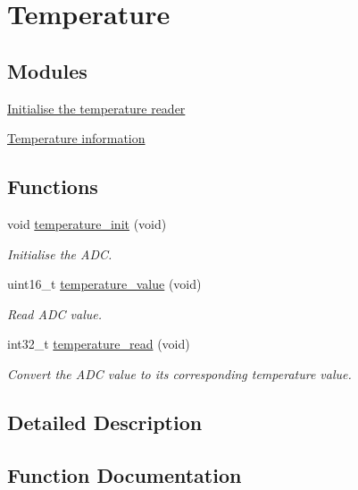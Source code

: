 \hypertarget{group___temperature}{}\section{Temperature}
\label{group___temperature}
\subsection*{Modules}
\begin{DoxyCompactItemize}
\item 
\hyperlink{group___temperature___init}{Initialise the temperature reader}
\item 
\hyperlink{group___temperature___data}{Temperature information}
\end{DoxyCompactItemize}
\subsection*{Functions}
\begin{DoxyCompactItemize}
\item 
void \hyperlink{group___temperature_ga7da890f6748bbeb05511fd20100cb6ef}{temperature\+\_\+init} (void)
\begin{DoxyCompactList}\small\item\em Initialise the A\+DC. \end{DoxyCompactList}\item 
uint16\+\_\+t \hyperlink{group___temperature_ga74915aedf88ee7840a64ab372d768ca1}{temperature\+\_\+value} (void)
\begin{DoxyCompactList}\small\item\em Read A\+DC value. \end{DoxyCompactList}\item 
int32\+\_\+t \hyperlink{group___temperature_gad2e261b9f6af30d5857f1e2a892a9592}{temperature\+\_\+read} (void)
\begin{DoxyCompactList}\small\item\em Convert the A\+DC value to its corresponding temperature value. \end{DoxyCompactList}\end{DoxyCompactItemize}


\subsection{Detailed Description}


\subsection{Function Documentation}
\mbox{\label{group___temperature_ga7da890f6748bbeb05511fd20100cb6ef}} 
